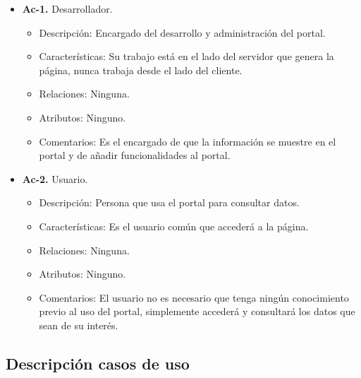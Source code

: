\begin{itemize}
  \item \textbf{Ac-1.} Desarrollador.
  \begin{itemize}
   \item Descripción: Encargado del desarrollo y administración del portal.
   \item Características: Su trabajo está en el lado del servidor que genera la página, nunca trabaja desde el lado del cliente.
   \item Relaciones: Ninguna.
   \item Atributos: Ninguno.
   \item Comentarios: Es el encargado de que la información se muestre en el portal y de añadir funcionalidades al portal.
  \end{itemize}
  
  \item \textbf{Ac-2.} Usuario.
  \begin{itemize}
   \item Descripción: Persona que usa el portal para consultar datos.
   \item Características: Es el usuario común que accederá a la página.
   \item Relaciones: Ninguna.
   \item Atributos: Ninguno.
   \item Comentarios: El usuario no es necesario que tenga ningún conocimiento previo al uso del portal, simplemente accederá y consultará los datos que sean de su interés.
  \end{itemize}
\end{itemize}

\subsection{Descripción casos de uso}

